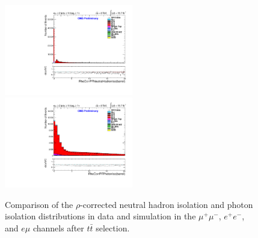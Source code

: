 \documentclass[oneside, a4paper, 11pt, ]{report}
\begin{document}
\begin{figure}
\includegraphics[width=0.5\textwidth]{Plots/ControlPlots/TTbarDiLeptonAnalysis/EMu/Photons/AllPhotons/Photon_RhoCorrectedPFNeutralHadronIso_barrel_splitTTbar_ratio.pdf}
\includegraphics[width=0.5\textwidth]{Plots/ControlPlots/TTbarDiLeptonAnalysis/EMu/Photons/AllPhotons/Photon_RhoCorrectedPFPhotonIso_barrel_splitTTbar_ratio.pdf}
\caption{Comparison of the $\rho$-corrected neutral hadron isolation and photon isolation distributions in data and simulation in the $\mu^{+}\mu^{-}$, $e^{+}e^{-}$, and $e\mu$ channels after $t\bar{t}$ selection.}
\label{fig-ttbarNeutralHadronAndPhotonIso}
\end{figure}
\end{document}
